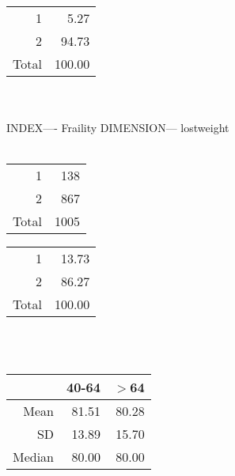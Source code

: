 \documentclass[11pt]{article}
\begin{document}
% 
\begin{tabular}{rr}
   \hline
1 & 5.27 \\ 
  2 & 94.73 \\ 
  Total & 100.00 \\ 
   \hline
\end{tabular}
\\\\ 
INDEX---- Fraility DIMENSION--- lostweight 
 \\\\ 
% 
\begin{tabular}{rr}
   \hline
1 & 138 \\ 
  2 & 867 \\ 
  Total & 1005 \\ 
   \hline
\end{tabular}
% 
\begin{tabular}{rr}
   \hline
1 & 13.73 \\ 
  2 & 86.27 \\ 
  Total & 100.00 \\ 
   \hline
\end{tabular}
\\\\ 
% 
\begin{tabular}{rrr}
  \hline
 & 40-64 & $>$64 \\ 
  \hline
Mean & 81.51 & 80.28 \\ 
  SD & 13.89 & 15.70 \\ 
  Median & 80.00 & 80.00 \\ 
   \hline
\end{tabular}
\end{document}
